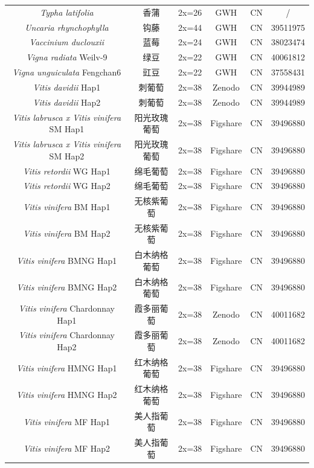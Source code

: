 {{\begin{longtable}{cccccc}
    \textit{Typha latifolia} & 香蒲 & 2x=26 & GWH & CN & / \\
    \textit{Uncaria rhynchophylla} & 钩藤 & 2x=44 & GWH & CN & 39511975 \\
    \textit{Vaccinium duclouxii} & 蓝莓 & 2x=24 & GWH & CN & 38023474 \\
    \textit{Vigna radiata} Weilv-9 & 绿豆 & 2x=22 & GWH & CN & 40061812 \\
    \textit{Vigna unguiculata} Fengchan6 & 豇豆 & 2x=22 & GWH & CN & 37558431 \\
    \textit{Vitis davidii} Hap1 & 刺葡萄 & 2x=38 & Zenodo & CN & 39944989 \\
    \textit{Vitis davidii} Hap2 & 刺葡萄 & 2x=38 & Zenodo & CN & 39944989 \\
    \textit{Vitis labrusca x Vitis vinifera} SM Hap1 & 阳光玫瑰葡萄 & 2x=38 & Figshare & CN & 39496880 \\
    \textit{Vitis labrusca x Vitis vinifera} SM Hap2 & 阳光玫瑰葡萄 & 2x=38 & Figshare & CN & 39496880 \\
    \textit{Vitis retordii} WG Hap1 & 绵毛葡萄 & 2x=38 & Figshare & CN & 39496880 \\
    \textit{Vitis retordii} WG Hap2 & 绵毛葡萄 & 2x=38 & Figshare & CN & 39496880 \\
    \textit{Vitis vinifera} BM Hap1 & 无核紫葡萄 & 2x=38 & Figshare & CN & 39496880 \\
    \textit{Vitis vinifera} BM Hap2 & 无核紫葡萄 & 2x=38 & Figshare & CN & 39496880 \\
    \textit{Vitis vinifera} BMNG Hap1 & 白木纳格葡萄 & 2x=38 & Figshare & CN & 39496880 \\
    \textit{Vitis vinifera} BMNG Hap2 & 白木纳格葡萄 & 2x=38 & Figshare & CN & 39496880 \\
    \textit{Vitis vinifera} Chardonnay Hap1 & 霞多丽葡萄 & 2x=38 & Zenodo & CN & 40011682 \\
    \textit{Vitis vinifera} Chardonnay Hap2 & 霞多丽葡萄 & 2x=38 & Zenodo & CN & 40011682 \\
    \textit{Vitis vinifera} HMNG Hap1 & 红木纳格葡萄 & 2x=38 & Figshare & CN & 39496880 \\
    \textit{Vitis vinifera} HMNG Hap2 & 红木纳格葡萄 & 2x=38 & Figshare & CN & 39496880 \\
    \textit{Vitis vinifera} MF Hap1 & 美人指葡萄 & 2x=38 & Figshare & CN & 39496880 \\
    \textit{Vitis vinifera} MF Hap2 & 美人指葡萄 & 2x=38 & Figshare & CN & 39496880 \\

\end{longtable}}}
